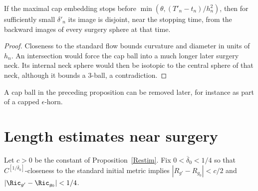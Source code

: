 \begin{claim}
\label{claim:ball-disjoint-from-surgery-spheres}
If the maximal cap embedding stops before $\min(\theta,(T'_n-t_n)/h_n^2)$, then for sufficiently small $\delta'_n$ its image is disjoint, near the stopping time, from the backward images of every surgery sphere at that time.
\end{claim}
\begin{proof}
\sketch
{}
Closeness to the standard flow bounds curvature and diameter in units of $h_n$. An intersection would force the cap ball into a much longer later surgery neck. Its internal neck sphere would then be isotopic to the central sphere of that neck, although it bounds a $3$-ball, a contradiction.
\end{proof}

\begin{remark}
\label{rem:ball-removed-by-later-surgery}
A cap ball in the preceding proposition can be removed later, for instance as part of a capped $\epsilon$-horn.
\end{remark}

\section{Length estimates near surgery}

\begin{definition}
\label{def:overline-delta-0}\label{defnoverlinedelta0}
Let $c>0$ be the constant of Proposition~\ref{Restim}. Fix $0<\overline\delta_0<1/4$ so that $C^{[1/\overline\delta_0]}$-closeness to the standard initial metric implies $|R_{g'}-R_{g_0}|<c/2$ and $|\Ric_{g'}-\Ric_{g_0}|<1/4$.
\end{definition}

